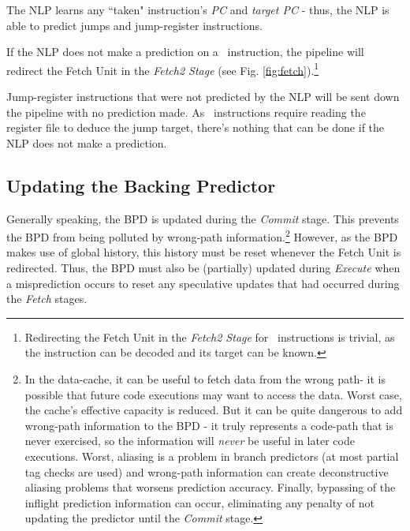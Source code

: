 The NLP learns any ``taken" instruction's {\em PC} and {\em target PC} - thus, the NLP is able to predict jumps and jump-register instructions.

If the NLP does not make a prediction on a \jal\ instruction, the pipeline will redirect the Fetch Unit in the {\em Fetch2 Stage} (see Fig. \ref{fig:fetch}).\footnote{Redirecting the Fetch Unit in the {\em Fetch2 Stage} for \jal\ instructions is trivial, as the instruction can be decoded and its target can be known.}

Jump-register instructions that were not predicted by the NLP will be sent down the pipeline with no prediction made.  As \jalr\ instructions require reading the register file to deduce the jump target, there's nothing that can be done if the NLP does not make a prediction.


\subsection{Updating the Backing Predictor}

Generally speaking, the BPD is updated during the {\em Commit} stage. This prevents the BPD from being polluted by wrong-path information.\footnote{In the data-cache, it can be useful to fetch data from the wrong path- it is possible that future code executions may want to access the data. Worst case, the cache's effective capacity is reduced. But it can be quite dangerous to add wrong-path information to the BPD - it truly represents a code-path that is never exercised, so the information will {\em never} be useful in later code executions. Worst, aliasing is a problem in branch predictors (at most partial tag checks are used) and wrong-path information can create deconstructive aliasing problems that worsens prediction accuracy.  Finally, bypassing of the inflight prediction information can occur, eliminating any penalty of not updating the predictor until the {\em Commit} stage.}  
However, as the BPD makes use of global history, this history must be reset whenever the Fetch Unit is redirected. Thus, the BPD must also be (partially) updated during {\em Execute} when a misprediction occurs to reset any speculative updates that had occurred during the {\em Fetch} stages.





